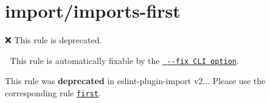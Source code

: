 \chapter{import/imports-\/first}
\hypertarget{md_pkiclassroomrescheduler_2src_2main_2frontend_2node__modules_2eslint-plugin-import_2docs_2rules_2imports-first}{}\label{md_pkiclassroomrescheduler_2src_2main_2frontend_2node__modules_2eslint-plugin-import_2docs_2rules_2imports-first}
\label{md_pkiclassroomrescheduler_2src_2main_2frontend_2node__modules_2eslint-plugin-import_2docs_2rules_2imports-first_autotoc_md9876}%
%
 ❌ This rule is deprecated.

🔧 This rule is automatically fixable by the \href{https://eslint.org/docs/latest/user-guide/command-line-interface\#--fix}{\texttt{ {\ttfamily -\/-\/fix} CLI option}}.

This rule was {\bfseries{deprecated}} in eslint-\/plugin-\/import v2... Please use the corresponding rule \href{https://github.com/import-js/eslint-plugin-import/blob/HEAD/docs/rules/first.md}{\texttt{ {\ttfamily first}}}. 
